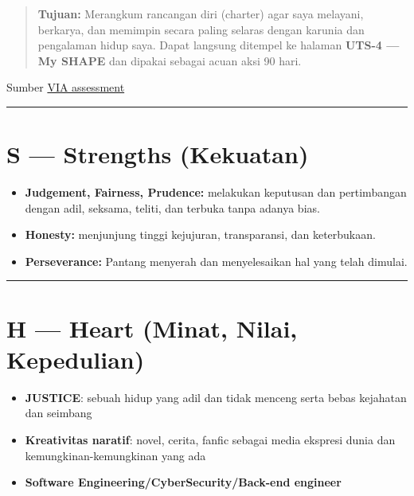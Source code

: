 \documentclass[
  letterpaper,
  DIV=11,
  numbers=noendperiod]{scrreprt}
\providecommand{\tightlist}{%
  \setlength{\itemsep}{0pt}\setlength{\parskip}{0pt}}
\begin{document}
\begin{quote}
\textbf{Tujuan:} Merangkum rancangan diri (charter) agar saya melayani,
berkarya, dan memimpin secara paling selaras dengan karunia dan
pengalaman hidup saya. Dapat langsung ditempel ke halaman \textbf{UTS-4
--- My SHAPE} dan dipakai sebagai acuan aksi 90 hari.
\end{quote}

Sumber \href{StrengthsProfile-Daniel-WG.pdf}{VIA assessment}

\begin{center}\rule{0.5\linewidth}{0.5pt}\end{center}

\section{S --- Strengths (Kekuatan)}\label{s-strengths-kekuatan}

\begin{itemize}
\item
  \textbf{Judgement, Fairness, Prudence:} melakukan keputusan dan
  pertimbangan dengan adil, seksama, teliti, dan terbuka tanpa adanya
  bias.
\item
  \textbf{Honesty:} menjunjung tinggi kejujuran, transparansi, dan
  keterbukaan.
\item
  \textbf{Perseverance:} Pantang menyerah dan menyelesaikan hal yang
  telah dimulai.
\end{itemize}

\begin{center}\rule{0.5\linewidth}{0.5pt}\end{center}

\section{H --- Heart (Minat, Nilai,
Kepedulian)}\label{h-heart-minat-nilai-kepedulian}

\begin{itemize}
\tightlist
\item
  \textbf{JUSTICE}: sebuah hidup yang adil dan tidak menceng serta bebas
  kejahatan dan seimbang
\item
  \textbf{Kreativitas naratif}: novel, cerita, fanfic sebagai media
  ekspresi dunia dan kemungkinan-kemungkinan yang ada
\item
  \textbf{Software Engineering/CyberSecurity/Back-end engineer}
\end{itemize}
\end{document}
